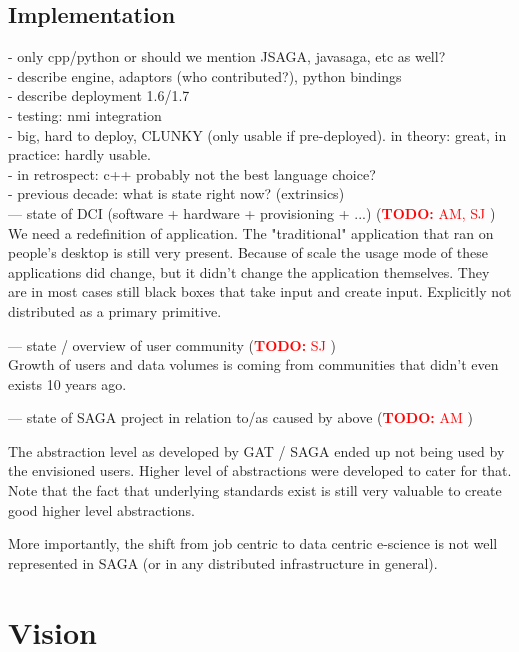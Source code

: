 \documentclass{article}
\newcommand{\B}[1]{\textbf{#1}}
\newcommand{\nind}{\noindent}
\newcommand{\todo}[1]{{\textcolor{red}{\B{TODO:} #1 }}}
\begin{document}
 \subsection{Implementation}
 - only cpp/python or should we mention JSAGA, javasaga, etc as well?\\
 - describe engine, adaptors (who contributed?), python bindings\\
 - describe deployment 1.6/1.7 \\
 - testing: nmi integration \\
 - big, hard to deploy, CLUNKY (only usable if pre-deployed). in theory: great, in practice: hardly usable. \\
 - in retrospect: c++ probably not the best language choice? \\
 


 \nind
 - previous decade: what is state right now? (extrinsics)\\
 --- state of DCI (software + hardware + provisioning + ...) (\todo{AM, SJ})\\
 
We need a redefinition of application. The "traditional" application that ran on people's desktop is still very present.
Because of scale the usage mode of these applications did change, but it didn't change the application themselves.
They are in most cases still black boxes that take input and create input.
Explicitly not distributed as a primary primitive.

 --- state / overview of user community (\todo{SJ})\\
 
 Growth of users and data volumes is coming from communities that didn't even exists 10 years ago.
 
 
 --- state of SAGA project in relation to/as caused by above (\todo{AM})

The abstraction level as developed by GAT / SAGA ended up not being used by the envisioned users.
Higher level of abstractions were developed to cater for that. Note that the fact that underlying standards exist is still very valuable to create good higher level abstractions.

More importantly, the shift from job centric to data centric e-science is not well represented in SAGA (or in any distributed infrastructure in general).

\section{Vision}
\end{document}

